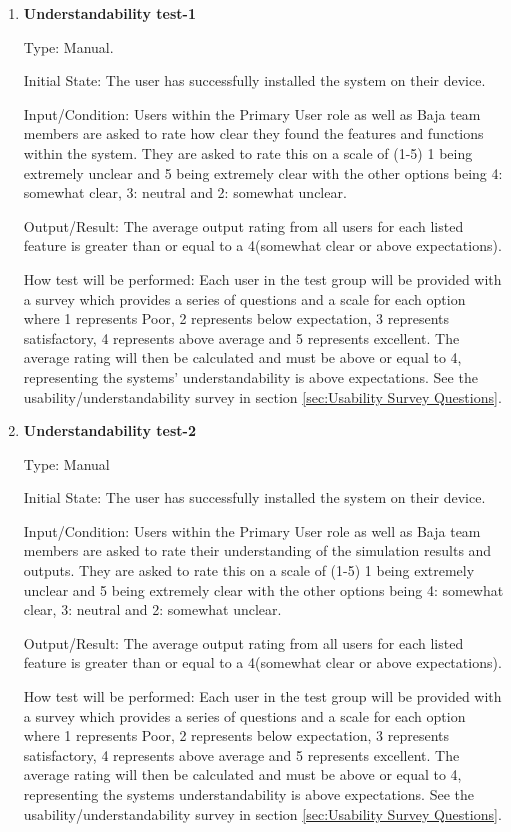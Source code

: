 \documentclass[12pt, titlepage]{article}
\begin{document}
\begin{enumerate}

  \item {} \hypertarget{Understandability test-1}{\textbf{Understandability test-1}} \label{Understandability test-1}

Type: Manual.
					
Initial State: The user has successfully installed the system on their device.
					
Input/Condition: Users within the Primary User role as well as Baja team members are asked to rate how clear they found the features and functions within the system. 
They are asked to rate this on a scale of (1-5) 1 being extremely unclear and 5 being extremely clear with the other options being 4: somewhat clear, 3: neutral and 2: somewhat unclear. 
					
Output/Result: The average output rating from all users for each listed feature is greater than or equal to a 4(somewhat clear or above expectations).
					
How test will be performed: Each user in the test group will be provided with a survey which provides a series of questions and a scale for each option where 1 represents Poor, 2 represents below expectation, 3 represents satisfactory, 4 represents above average and 5 represents excellent.
The average rating will then be calculated and must be above or equal to 4, representing the systems' understandability is above expectations.  
See the usability/understandability survey in section \ref{sec:Usability Survey Questions}. 

 \item {} \hypertarget{Understandability test-2}{\textbf{Understandability test-2}} \label{Understandability test-2}

Type: Manual
					
Initial State: The user has successfully installed the system on their device.
					
Input/Condition: Users within the Primary User role as well as Baja team members are asked to rate their understanding of the simulation results and outputs. 
They are asked to rate this on a scale of (1-5) 1 being extremely unclear and 5 being extremely clear with the other options being 4: somewhat clear, 3: neutral and 2: somewhat unclear. 
					
Output/Result: The average output rating from all users for each listed feature is greater than or equal to a 4(somewhat clear or above expectations).
					
How test will be performed: Each user in the test group will be provided with a survey which provides a series of questions and a scale for each option where 1 represents Poor, 2 represents below expectation, 3 represents satisfactory, 4 represents above average and 5 represents excellent.
The average rating will then be calculated and must be above or equal to 4, representing the systems understandability is above expectations. 
See the usability/understandability survey in section \ref{sec:Usability Survey Questions}. 

\end{enumerate}
\end{document}
